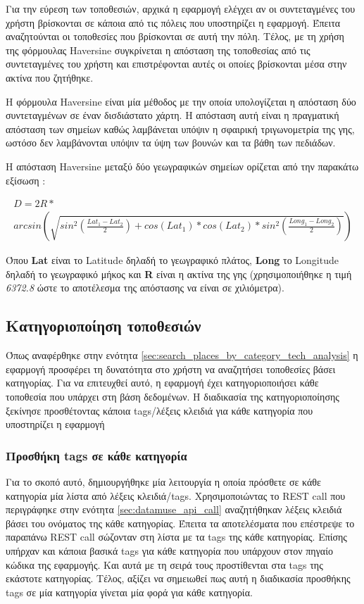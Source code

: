 \documentclass[oneside, 12pt]{book}
\begin{document}
Για την εύρεση των τοποθεσιών, αρχικά η εφαρμογή ελέγχει αν οι 
συντεταγμένες του χρήστη βρίσκονται σε κάποια από τις πόλεις που 
υποστηρίζει η εφαρμογή. Έπειτα αναζητούνται οι τοποθεσίες που 
βρίσκονται σε αυτή την πόλη. Τέλος, με τη χρήση της φόρμουλας 
Haversine συγκρίνεται η απόσταση της τοποθεσίας από τις 
συντεταγμένες του χρήστη και επιστρέφονται αυτές οι οποίες 
βρίσκονται μέσα στην ακτίνα που ζητήθηκε.

Η φόρμουλα Haversine είναι μία μέθοδος με την οποία υπολογίζεται η 
απόσταση δύο συντεταγμένων σε έναν δισδιάστατο χάρτη. Η απόσταση 
αυτή είναι η πραγματική απόσταση των σημείων καθώς λαμβάνεται 
υπόψιν η σφαιρική τριγωνομετρία της γης, ωστόσο δεν λαμβάνονται 
υπόψιν τα ύψη των βουνών και τα βάθη των πεδιάδων.
\cite{alam2016implementation}

Η απόσταση Haversine μεταξύ δύο γεωγραφικών σημείων ορίζεται από την παρακάτω εξίσωση \cite{yoga2017implementation}:

\begin{multline} \label{eq:haversine_equation}
    D = 2R*\\
    arcsin\left(\sqrt{sin^2(\frac{Lat_1-Lat_2}{2})+cos(Lat_1)*cos(Lat_2)*sin^2(\frac{Long_1-Long_2}{2})}\right)
\end{multline}

Όπου \textbf{Lat} είναι το Latitude δηλαδή το γεωγραφικό πλάτος,
\textbf{Long} το Longitude δηλαδή το γεωγραφικό μήκος και
\textbf{R} είναι η ακτίνα της γης (χρησιμοποιήθηκε η τιμή \textit{6372.8} ώστε 
το αποτέλεσμα της απόστασης να είναι σε χιλιόμετρα).

\subsection{Κατηγοριοποίηση τοποθεσιών}\label{sec:location_categorization}
Όπως αναφέρθηκε στην ενότητα \ref{sec:search_places_by_category_tech_analysis}
η εφαρμογή προσφέρει τη δυνατότητα στο χρήστη να αναζητήσει τοποθεσίες βάσει κατηγορίας. Για να επιτευχθεί αυτό, η εφαρμογή έχει κατηγοριοποιήσει κάθε τοποθεσία που υπάρχει στη βάση δεδομένων.
Η διαδικασία της κατηγοριοποίησης ξεκίνησε προσθέτοντας κάποια tags/λέξεις κλειδιά για κάθε κατηγορία που υποστηρίζει η εφαρμογή

\subsubsection{Προσθήκη tags σε κάθε κατηγορία}
Για το σκοπό αυτό, δημιουργήθηκε μία λειτουργία η οποία πρόσθετε σε 
κάθε κατηγορία μία λίστα από λέξεις κλειδιά/tags.
Χρησιμοποιώντας το REST call που περιγράφηκε στην ενότητα 
\ref{sec:datamuse_api_call} αναζητήθηκαν λέξεις κλειδιά βάσει του 
ονόματος της κάθε κατηγορίας. Έπειτα τα αποτελέσματα που επέστρεψε 
το παραπάνω REST call σώζονταν στη λίστα με τα tags της κάθε 
κατηγορίας. Επίσης υπήρχαν και κάποια βασικά tags για κάθε 
κατηγορία που υπάρχουν στον πηγαίο κώδικα της εφαρμογής. Και αυτά με
τη σειρά τους προστίθενται στα tags της εκάστοτε κατηγορίας.
Τέλος, αξίζει να σημειωθεί πως αυτή η διαδικασία προσθήκης tags σε 
μία κατηγορία γίνεται μία φορά για κάθε κατηγορία.
\end{document}
